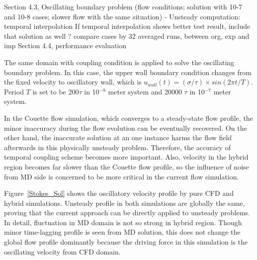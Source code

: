 \documentclass[preprint,12pt]{elsarticle}
\begin{document}
Section 4.3, Oscillating boundary problem (flow conditions; solution with 10-7 and 10-8 cases; slower flow with the same situation)
- Unsteady computation: temporal interpolation
If temporal interpolation shows better test result, include that solution as well ? compare cases by 32 averaged runs, between org, exp and imp
Section 4.4, performance evaluation


The same domain with coupling condition is applied to solve the oscillating boundary problem. In this case, the upper wall boundary condition changes from the fixed velocity to oscillatory wall, which is $u_{wall}(t)=({\sigma}/{\tau}){\times}sin(2{\pi}t/T)$. Period $T$ is set to be 200$\tau$ in 10$^{-8}$ meter system and 20000 $\tau$ in 10$^{-7}$ meter system. 

In the Couette flow simulation, which converges to a steady-state flow profile, the minor inaccuracy during the flow evolution can be eventually recovered. On the other hand, the inaccurate solution at an one instance harms the flow field afterwards in this physically unsteady problem. Therefore, the accuracy of temporal coupling scheme becomes more important. Also, velocity in the hybrid region becomes far slower than the Couette flow profile, so the influence of noise from MD side is concerned to be more critical in the current flow simulation.

Figure~\ref{Stokes_Sol} shows the oscillatory velocity profile by pure CFD and hybrid simulations. Unsteady profile in both simulations are globally the same, proving that the current approach can be directly applied to unsteady problems. In detail, fluctuation in MD domain is not so strong in hybrid region. Though minor time-lagging profile is seen from MD solution, this does not change the global flow profile dominantly because the driving force in this simulation is the oscillating velocity from CFD domain.
\end{document}
